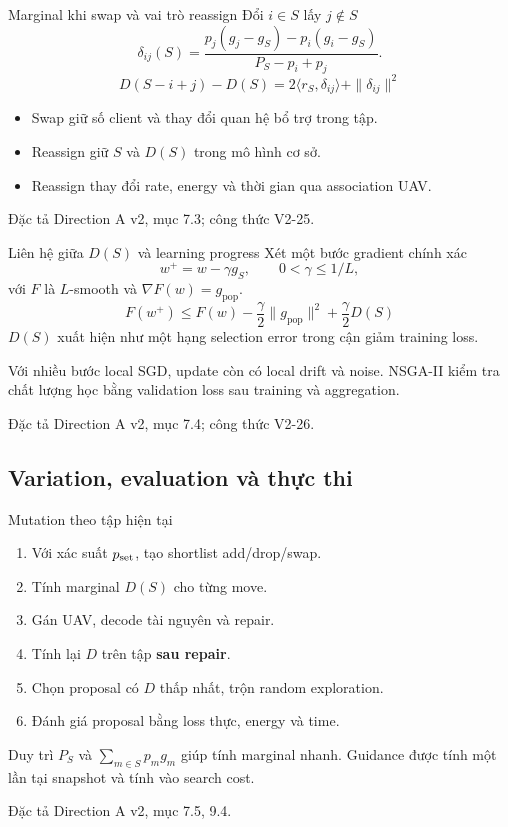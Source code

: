 \documentclass[10pt,aspectratio=43]{beamer}
\newcommand{\src}[1]{\par\vfill{\fontsize{6}{7.2}\selectfont\color{Muted}
 Đặc tả Direction A v2, mục #1.\par}}
\newcommand{\pop}{\mathrm{pop}}
\begin{document}
\begin{frame}[t]{Marginal khi swap và vai trò reassign}
\relax
Đổi $i\in S$ lấy $j\notin S$
\[
\delta_{ij}(S)=
\frac{p_j(g_j-g_S)-p_i(g_i-g_S)}
{P_S-p_i+p_j}.
\]
\[
\boxed{\displaystyle
D(S-i+j)-D(S)=2\langle r_S,\delta_{ij}\rangle+\|\delta_{ij}\|^2}
\]
\medskip
\begin{itemize}
\item Swap giữ số client và thay đổi quan hệ bổ trợ trong tập.
\item Reassign giữ $S$ và $D(S)$ trong mô hình cơ sở.
\item Reassign thay đổi rate, energy và thời gian qua association UAV.
\end{itemize}
\src{7.3; công thức V2-25}
\end{frame}

\begin{frame}[t]{Liên hệ giữa $D(S)$ và learning progress}
\relax
Xét một bước gradient chính xác
\[
w^+=w-\gamma g_S,\qquad 0<\gamma\le1/L,
\]
với $F$ là $L$-smooth và $\nabla F(w)=g_{\pop}$.
\[
\boxed{\displaystyle
F(w^+)\le F(w)-\frac{\gamma}{2}\|g_{\pop}\|^2
+\frac{\gamma}{2}D(S)}
\]
\medskip
$D(S)$ xuất hiện như một hạng selection error trong cận giảm training loss.
\medskip

Với nhiều bước local SGD, update còn có local drift và noise. NSGA-II kiểm tra chất lượng học bằng validation loss sau training và aggregation.
\src{7.4; công thức V2-26}
\end{frame}

\subsection{Variation, evaluation và thực thi}
\begin{frame}[t]{Mutation theo tập hiện tại}
\relax
\begin{enumerate}
\setlength{\itemsep}{.55em}
\item Với xác suất $p_{\rm set}$, tạo shortlist add/drop/swap.
\item Tính marginal $D(S)$ cho từng move.
\item Gán UAV, decode tài nguyên và repair.
\item Tính lại $D$ trên tập \textbf{sau repair}.
\item Chọn proposal có $D$ thấp nhất, trộn random exploration.
\item Đánh giá proposal bằng loss thực, energy và time.
\end{enumerate}
\medskip
Duy trì $P_S$ và $\sum_{m\in S}p_mg_m$ giúp tính marginal nhanh. Guidance được tính một lần tại snapshot và tính vào search cost.
\src{7.5, 9.4}
\end{frame}
\end{document}
